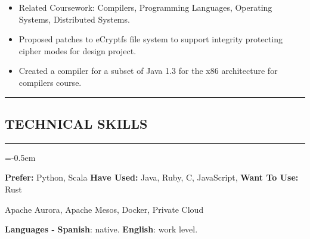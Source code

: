 \documentclass[10pt,letterpaper]{article}
\newcommand{\CPP}
{C\nolinebreak[4]\hspace{-.05em}\raisebox{.22ex}{\footnotesize\bf ++}}
\newcommand{\sectionTitle}[1]{
  \hrule
  \vspace{-1.0em} 
  \subsection*{\uppercase{\textbf{#1}}}
  \vspace{-0.3em}
    \hrule
    \vspace{0.5em}  
}
\newcommand{\languageSection}[4]{
  \vspace{-1.0em}
  \begin{center}
    \textbf{Languages - } \textbf{#1}: #2. \textbf{#3}: #4.
  \end{center}
}
\begin{document}
  \begin{itemize}[label=\textbullet]
    \item Related Coursework: Compilers, Programming Languages, Operating
    Systems, Distributed Systems.
    \item Proposed patches to eCryptfs file system to support
    integrity protecting cipher modes for design project.
    \item Created a compiler for a subset of Java 1.3 for the
    x86 architecture for compilers course.
  \end{itemize}
  
  \sectionTitle{Technical Skills}
  
  \begin{description}[labelindent=\parindent]
    \parskip=-0.5em
    \item[Languages:] \textbf{Prefer:} Python, Scala \textbf{Have Used:} Java, Ruby, \CPP, JavaScript, \textbf{Want To Use:} Rust
    \item[Systems:] Apache Aurora, Apache Mesos, Docker, Private Cloud
  \end{description}
  
  \languageSection{Spanish}{native}{English}{work level}
  
\end{document}
